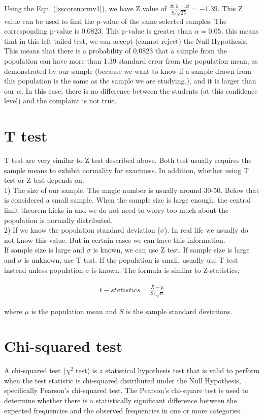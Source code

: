 Using the Eqn. (\ref{zscorenormv1}), we have Z value of $\frac{29.5-32}{9/\sqrt{25}} = -1.39$. This Z value can be used to find the p-value of the same selected samples. The corresponding p-value is 0.0823. This p-value is greater than $\alpha=0.05$, this means that in this left-tailed test, we can accept (cannot reject) the Null Hypothesis. This means that there is a probability of 0.0823 that a sample from the population can have more than 1.39 standard error from the population mean, as demonstrated by our sample (because we want to know if a sample drawn from this population is the same as the sample we are studying.), and it is larger than our $\alpha$. In this case, there is no difference between the students (at this confidence level) and the complaint is not true.

\section{T test}
\label{ttest}

T test are very similar to Z test described above. Both test usually requires the sample means to exhibit normality for exactness. In addition, whether using T test or Z test depends on:\\

1) The size of our sample. The magic number is usually around 30-50. Below that is considered a small sample. When the sample size is large enough, the central limit theorem kicks in and we do not need to worry too much about the population is normally distributed. \\

2) If we know the population standard deviation ($\sigma$). In real life we usually do not know this value. But in certain cases we can have this information. \\

If sample size is large and $\sigma$ is known, we can use Z test. If sample size is large and $\sigma$ is unknown, use T test. If the population is small, usually use T test instead unless population $\sigma$ is known. The formula is similar to Z-statistics:

\begin{eqnarray}
t-statistics = \frac{\bar{X} - \mu}{S/\sqrt{n}}
\end{eqnarray}

where $\mu$ is the population mean and $S$ is the sample standard deviations. 



\section{Chi-squared test}
A chi-squared test ($\chi^2$ test) is a statistical hypothesis test that is valid to perform when the test statistic is chi-squared distributed under the Null Hypothesis, specifically Pearson's chi-squared test. The Pearson's chi-square test is used to determine whether there is a statistically significant difference between the expected frequencies and the observed frequencies in one or more categories.\\

